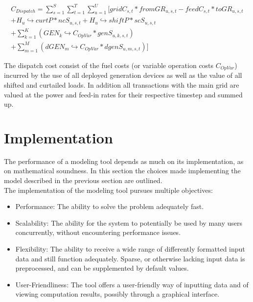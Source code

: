 \documentclass[
	11pt,								%
	DIV10,								%
	a4paper,         					%
	oneside,							%
	headheight=20pt,					%
	footheight=20pt,					%
    parskip=full,						%
    listof=totoc,						%
	bibliography=totoc,					%
	index=totoc,						%
]{scrartcl}
\begin{document}
\begin{equation}
	\begin{split}
		C_{Dispatch} = \sum_{s=1}^{S}\sum_{t=1}^{T}\sum_{u=1}^{U}[gridC_{s,t} * fromGR_{u,s,t} - feedC_{s,t} * toGR_{u,s,t}\\
		+ H_u\hookrightarrow  curtP * ncS_{u,s,t} + H_u\hookrightarrow  shiftP * scS_{u,s,t}\\
		+ \sum_{k=1}^K(GEN_k\hookrightarrow  C_{OpVar} * genS_{u,k,s,t})\\ 
		+ \sum_{m=1}^M(dGEN_m\hookrightarrow  C_{OpVar} * dgenS_{u,m,s,t})]
	\end{split}
\end{equation}

The dispatch cost consist of the fuel costs (or variable operation costs $C_{OpVar}$) incurred by the use of all deployed generation devices as well as the value of all shifted and curtailed loads. In addition all transactions with the main grid are valued at the power and feed-in rates for their respective timestep and summed up.



\newpage
\section{Implementation}
The performance of a modeling tool depends as much on its implementation, as on mathematical soundness. In this section the choices made implementing the model described in the previous section are outlined.\\
The implementation of the modeling tool pursues multiple objectives:
\begin{itemize}
	\item Performance: The ability to solve the problem adequately fast.
	\item Scalability: The ability for the system to potentially be used by many users concurrently, without encountering performance issues.
	\item Flexibility: The ability to receive a wide range of differently formatted input data and still function adequately. Sparse, or otherwise lacking input data is preprocessed, and can be supplemented by default values.
	\item User-Friendliness: The tool offers a user-friendly way of inputting data and of viewing computation results, possibly through a graphical interface.
\end{itemize}
\end{document}
